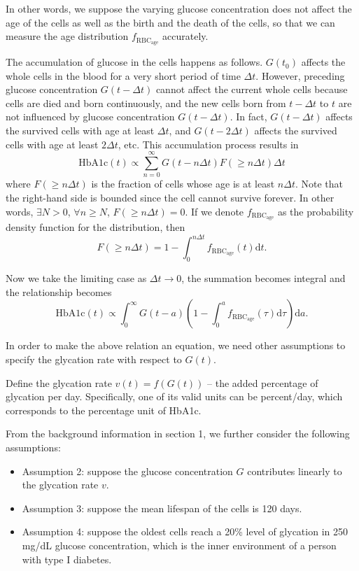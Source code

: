 \documentclass{article}
\newcommand{\hba}{\textrm{HbA1c}}
\newcommand{\f}{f_{\mathrm{RBC}_{\mathrm{age}}}}
\newcommand{\dd}{\mathrm{d }}
\begin{document}
In other words, we suppose the varying glucose concentration does not affect the age of the cells as well as the birth and the death of the cells, so that we can measure the age distribution $\f$ accurately.

The accumulation of glucose in the cells happens as follows. $G(t_0)$ affects the whole cells in the blood for a very short period of time $\Delta t$.  However, preceding glucose concentration $G(t-\Delta t)$ cannot affect the current whole cells because cells are died and born continuously, and the new cells born from $t-\Delta t$ to $t$ are not influenced by glucose concentration $G(t-\Delta t)$. In fact, $G(t-\Delta t)$ affects the survived cells with age at least $\Delta t$, and $G(t-2\Delta t)$ affects the survived cells with age at least $2\Delta t$, etc. This accumulation process results in
\[\hba(t) \propto \sum_{n=0}^\infty G(t-n\Delta t) F(\geq n\Delta t)\Delta t\]
where $F(\geq n\Delta t)$ is the fraction of cells whose age is at least $n\Delta t$. Note that the right-hand side is bounded since the cell cannot survive forever. In other words, $\exists N>0$, $\forall n \geq N$, $F(\geq n\Delta t)=0$. If we denote $\f$ as the probability density function for the distribution, then 
\[F(\geq n\Delta t) = 1-\int_{0}^{n\Delta t}\f(t)\dd t.\]

Now we take the limiting case as $\Delta t\rightarrow 0$, the summation becomes integral and the relationship becomes
\begin{equation}
\label{prop-h}
 \hba(t) \propto \int_{0}^\infty G(t-a) \left(1-\int_{0}^{a}\f(\tau)\dd \tau\right)\dd a.
\end{equation}

In order to make the above relation an equation, we need other assumptions to specify the glycation rate with respect to $G(t)$.

Define the glycation rate $v(t)=f(G(t))$  -- the added percentage of glycation per day. Specifically, one of its valid units can be percent/day, which corresponds to the percentage unit of \hba.

From the background information in section 1, we further consider the following assumptions:
\begin{itemize}

\item Assumption 2: suppose the glucose concentration $G$ contributes linearly to the glycation rate $v$. 

\item Assumption 3: suppose the mean lifespan of the cells is 120 days. %

\item Assumption 4: suppose the oldest cells reach a  20\% level of glycation in 250 mg/dL glucose concentration, which is the inner environment of a person with type I diabetes.
\end{itemize}
\end{document}
